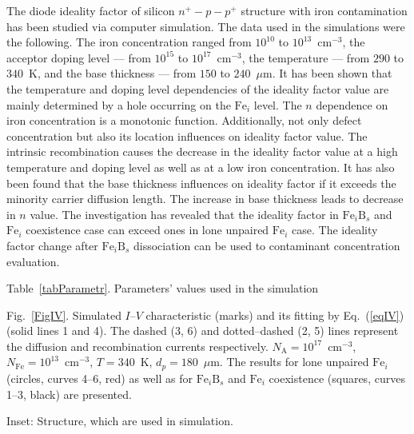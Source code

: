 \documentclass[12pt]{article}
\begin{document}
The diode ideality factor of silicon $n^+-p-p^+$ structure with iron contamination has been studied via computer simulation.
The data used in the simulations were the following.
The iron concentration ranged from $10^{10}$ to $10^{13}$~cm$^{-3}$,
the acceptor doping level --- from $10^{15}$ to $10^{17}$~cm$^{-3}$,
the temperature --- from $290$ to $340$~K,
and the base thickness --- from $150$ to $240$~$\mu$m.
It has been shown that the temperature and doping level dependencies of the ideality factor value
are mainly determined by a hole occurring on the $\mathrm{Fe}_i$ level. 
The $n$ dependence on iron concentration is a monotonic function.
Additionally, not only defect concentration but also its location influences on  ideality factor value.
The intrinsic recombination causes the decrease in the ideality factor value at a high temperature and doping level as well as at a low iron concentration.
It has also been found that the base thickness influences on ideality factor if it exceeds the minority carrier diffusion length. 
The increase in base thickness leads to decrease in $n$ value.
The investigation has revealed that the ideality factor in $\mathrm{Fe}_i\mathrm{B}_s$ and $\mathrm{Fe}_i$ coexistence case
can exceed ones in lone unpaired $\mathrm{Fe}_i$ case.
The ideality factor change after $\mathrm{Fe}_i\mathrm{B}_s$ dissociation can be used to contaminant concentration evaluation. 





\newpage

Table~\ref{tabParametr}.
Parameters' values used in the simulation

 Fig.~\ref{FigIV}.
Simulated $I$--$V$ characteristic (marks) and its fitting by Eq.~(\ref{eqIV}) (solid lines 1 and 4).
The dashed (3, 6) and dotted–dashed (2, 5) lines represent the diffusion and recombination currents respectively.
$N_\mathrm{A}=10^{17}$~cm$^{-3}$, $N_\mathrm{Fe}=10^{13}$~cm$^{-3}$, $T=340$~K, $d_p=180$~$\mu$m.
The results for lone unpaired $\mathrm{Fe}_i$ (circles, curves 4--6, red) as well as for $\mathrm{Fe}_i\mathrm{B}_s$ and $\mathrm{Fe}_i$ coexistence
(squares, curves 1--3, black) are presented.

Inset: Structure, which are used in simulation.
\end{document}
